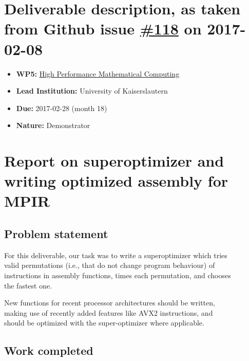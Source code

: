 \section*{\texorpdfstring{Deliverable description, as taken from Github
issue
\href{https://github.com/OpenDreamKit/OpenDreamKit/issues/118}{\#118} on
2017-02-08}{Deliverable description, as taken from Github issue \#118 on 2017-02-08}}\label{deliverable-description-as-taken-from-github-issue-118-on-2017-02-08}

\begin{itemize}
\tightlist
\item
  \textbf{WP5:}
  \href{https://github.com/OpenDreamKit/OpenDreamKit/tree/master/WP5}{High
  Performance Mathematical Computing}
\item
  \textbf{Lead Institution:} University of Kaiserslautern
\item
  \textbf{Due:} 2017-02-28 (month 18)
\item
  \textbf{Nature:} Demonstrator
\end{itemize}

\section*{Report on superoptimizer and writing optimized assembly for
MPIR}\label{report-on-superoptimizer-and-writing-optimized-assembly-for-mpir}

\subsection{Problem statement}\label{problem-statement}

For this deliverable, our task was to write a superoptimizer which
tries\\
valid permutations (i.e., that do not change program behaviour) of\\
instructions in assembly functions, times each permutation, and
chooses\\
the fastest one.

New functions for recent processor architectures should be written,\\
making use of recently added features like AVX2 instructions, and\\
should be optimized with the super-optimizer where applicable.

\subsection{Work completed}\label{work-completed}

